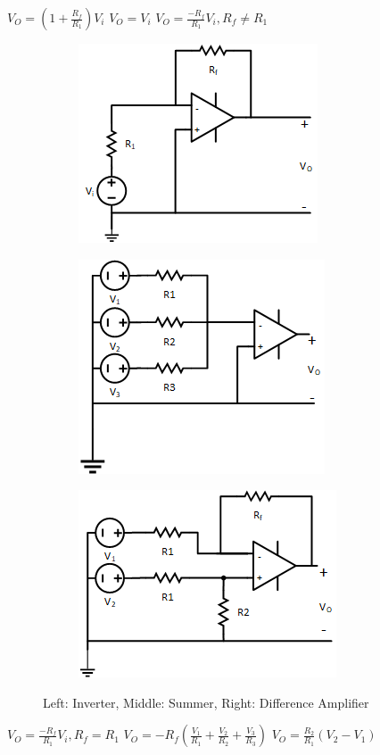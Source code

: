 \documentclass[10pt,letterpaper,twoside,notitlepage]{article}
\begin{document}
	$V_{O}=\left(1+\frac{R_f}{R_1}\right)V_i$
	\hspace{35mm} $V_{O}=V_{i}$
	\hspace{35mm} $V_{O}=\frac{-R_f}{R_1}V_i, R_f \neq R_1$
	
	\begin{figure}[ht]
		\begin{subfigure}
			\centering
			\includegraphics[scale=.7]{Inverter.png}
			\label{fig:Inverter}
		\end{subfigure}
		\hspace{15mm}
		\begin{subfigure}
			\centering
			\includegraphics[scale=.7]{Summer.png}
			\label{fig:Summer}
		\end{subfigure}
		\hspace{20mm}
		\begin{subfigure}
			\centering
			\includegraphics[scale=.7]{Subtractor.png}
			\label{fig:Subtractor}
		\end{subfigure}
		\caption{Left: Inverter, Middle: Summer, Right: Difference Amplifier}
	\end{figure}
	$V_{O}=\frac{-R_f}{R_1}V_i, R_f=R_1$
	\hspace{25mm} $V_{O} = -R_f\left(\frac{V_1}{R_1}+\frac{V_2}{R_2}+\frac{V_3}{R_3}\right)$
	\hspace{35mm} $V_{O}=\frac{R_2}{R_1}\left(V_2-V_1\right)$
	
\end{document}
